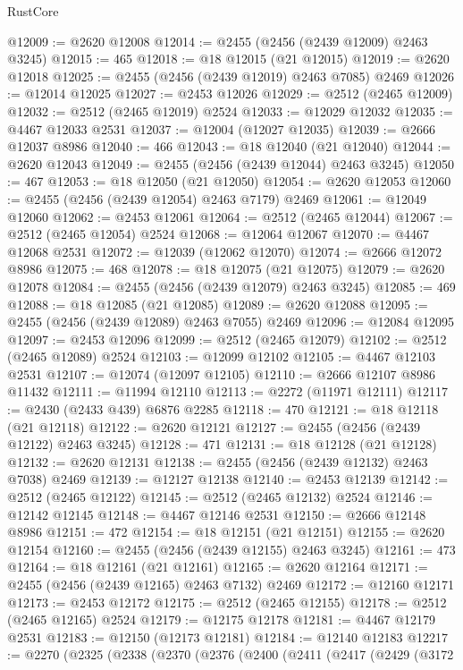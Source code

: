 \begin{lexlean}{RustCore}
\begin{coremodule}
@12009 := @2620 @12008
@12014 := @2455 (@2456 (@2439 @12009) @2463 @3245)
@12015 := 465
@12018 := @18 @12015 (@21 @12015)
@12019 := @2620 @12018
@12025 := @2455 (@2456 (@2439 @12019) @2463 @7085) @2469
@12026 := @12014 @12025
@12027 := @2453 @12026
@12029 := @2512 (@2465 @12009)
@12032 := @2512 (@2465 @12019) @2524
@12033 := @12029 @12032
@12035 := @4467 @12033 @2531
@12037 := @12004 (@12027 @12035)
@12039 := @2666 @12037 @8986
@12040 := 466
@12043 := @18 @12040 (@21 @12040)
@12044 := @2620 @12043
@12049 := @2455 (@2456 (@2439 @12044) @2463 @3245)
@12050 := 467
@12053 := @18 @12050 (@21 @12050)
@12054 := @2620 @12053
@12060 := @2455 (@2456 (@2439 @12054) @2463 @7179) @2469
@12061 := @12049 @12060
@12062 := @2453 @12061
@12064 := @2512 (@2465 @12044)
@12067 := @2512 (@2465 @12054) @2524
@12068 := @12064 @12067
@12070 := @4467 @12068 @2531
@12072 := @12039 (@12062 @12070)
@12074 := @2666 @12072 @8986
@12075 := 468
@12078 := @18 @12075 (@21 @12075)
@12079 := @2620 @12078
@12084 := @2455 (@2456 (@2439 @12079) @2463 @3245)
@12085 := 469
@12088 := @18 @12085 (@21 @12085)
@12089 := @2620 @12088
@12095 := @2455 (@2456 (@2439 @12089) @2463 @7055) @2469
@12096 := @12084 @12095
@12097 := @2453 @12096
@12099 := @2512 (@2465 @12079)
@12102 := @2512 (@2465 @12089) @2524
@12103 := @12099 @12102
@12105 := @4467 @12103 @2531
@12107 := @12074 (@12097 @12105)
@12110 := @2666 @12107 @8986 @11432
@12111 := @11994 @12110
@12113 := @2272 (@11971 @12111)
@12117 := @2430 (@2433 @439) @6876 @2285
@12118 := 470
@12121 := @18 @12118 (@21 @12118)
@12122 := @2620 @12121
@12127 := @2455 (@2456 (@2439 @12122) @2463 @3245)
@12128 := 471
@12131 := @18 @12128 (@21 @12128)
@12132 := @2620 @12131
@12138 := @2455 (@2456 (@2439 @12132) @2463 @7038) @2469
@12139 := @12127 @12138
@12140 := @2453 @12139
@12142 := @2512 (@2465 @12122)
@12145 := @2512 (@2465 @12132) @2524
@12146 := @12142 @12145
@12148 := @4467 @12146 @2531
@12150 := @2666 @12148 @8986
@12151 := 472
@12154 := @18 @12151 (@21 @12151)
@12155 := @2620 @12154
@12160 := @2455 (@2456 (@2439 @12155) @2463 @3245)
@12161 := 473
@12164 := @18 @12161 (@21 @12161)
@12165 := @2620 @12164
@12171 := @2455 (@2456 (@2439 @12165) @2463 @7132) @2469
@12172 := @12160 @12171
@12173 := @2453 @12172
@12175 := @2512 (@2465 @12155)
@12178 := @2512 (@2465 @12165) @2524
@12179 := @12175 @12178
@12181 := @4467 @12179 @2531
@12183 := @12150 (@12173 @12181)
@12184 := @12140 @12183
@12217 := @2270
    (@2325
      (@2338
        (@2370
          (@2376
            (@2400
              (@2411
                (@2417
                  (@2429
                    (@3172

\end{coremodule}
\end{lexlean}
